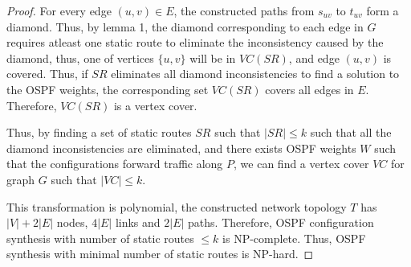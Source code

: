 \begin{proof}
For every edge $(u,v) \in E$, the constructed paths from 
$s_{uv}$ to $t_{uv}$ form a diamond. Thus, by lemma 1, 
the diamond corresponding to each edge in $G$ 
requires atleast one static route to eliminate
the inconsistency caused by the diamond, thus, one 
of vertices $\{u,v\}$ will be in $VC(SR)$, and edge $(u,v)$
is covered. Thus, if $SR$ eliminates all diamond inconsistencies
to find a solution to the OSPF weights, the corresponding set
$VC(SR)$ covers all edges in $E$. Therefore, $VC(SR)$ is a vertex
cover. 

Thus, by finding a set of static routes $SR$ such that $|SR| \leq k$
such that all the diamond inconsistencies are eliminated, and there
exists OSPF weights $W$ such that the configurations forward traffic
along $P$, we can find a vertex cover $VC$ for graph $G$ such that
$|VC| \leq k$. 

This transformation is polynomial, the constructed 
network topology $T$ has $|V| + 2|E|$ nodes, 
$4|E|$ links and $2|E|$ paths. Therefore, OSPF
configuration synthesis with number of static routes $\leq k$ is
NP-complete. Thus, OSPF synthesis with minimal number of 
static routes is NP-hard. 
\end{proof}
